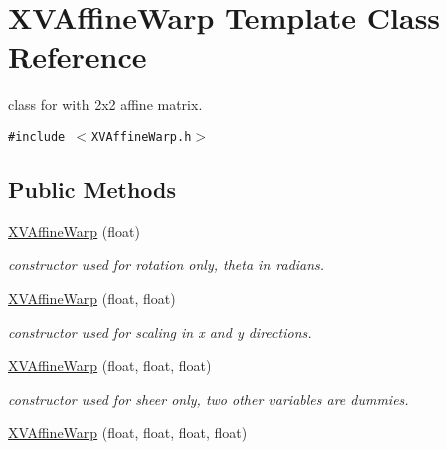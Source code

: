 \hypertarget{class_XVAffineWarp}{
\section{XVAffine\-Warp  Template Class Reference}
\label{XVAffineWarp}
}
class for with 2x2 affine matrix. 


{\tt \#include $<$XVAffine\-Warp.h$>$}

\subsection*{Public Methods}
\begin{CompactItemize}
\item 
\label{XVAffineWarp_a0}
\hypertarget{class_XVAffineWarp_a0}{
\hyperlink{class_XVAffineWarp_a0}{XVAffine\-Warp} (float)}

\begin{CompactList}\small\item\em constructor used for rotation only, theta in radians.\item\end{CompactList}\item 
\label{XVAffineWarp_a1}
\hypertarget{class_XVAffineWarp_a1}{
\hyperlink{class_XVAffineWarp_a1}{XVAffine\-Warp} (float, float)}

\begin{CompactList}\small\item\em constructor used for scaling in x and y directions.\item\end{CompactList}\item 
\label{XVAffineWarp_a2}
\hypertarget{class_XVAffineWarp_a2}{
\hyperlink{class_XVAffineWarp_a2}{XVAffine\-Warp} (float, float, float)}

\begin{CompactList}\small\item\em constructor used for sheer only, two other variables are dummies.\item\end{CompactList}\item 
\label{XVAffineWarp_a3}
\hypertarget{class_XVAffineWarp_a3}{
\hyperlink{class_XVAffineWarp_a3}{XVAffine\-Warp} (float, float, float, float)}


\end{CompactItemize}
